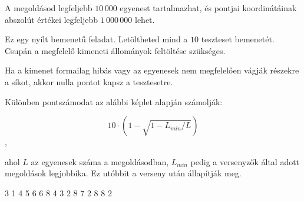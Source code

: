 A megoldásod legfeljebb $10\,000$ egyenest tartalmazhat, és pontjai koordinátáinak abszolút értékei legfeljebb $1\,000\,000$ lehet.



Ez egy nyílt bemenetű feladat. Letöltheted mind a $10$ teszteset bemenetét. Csupán a megfelelő kimeneti állományok feltöltése szükséges.

Ha a kimenet formailag hibás vagy az egyenesek nem megfelelően vágják részekre a síkot, akkor nulla pontot kapsz a tesztesetre.

Különben pontszámodat az alábbi képlet alapján számolják:

$$ 10 \cdot \left(1 - \sqrt{1 - L_{min} / L}\right)$$,

ahol $L$ az egyenesek száma a megoldásodban, $L_{min}$ pedig a versenyzők által adott megoldások legjobbika. Ez utóbbit a verseny után állapítják meg.

\pagebreak


3 1
4 5
6 6
8 4
3 2 8 7
2 8 8 2
\sampleEND


